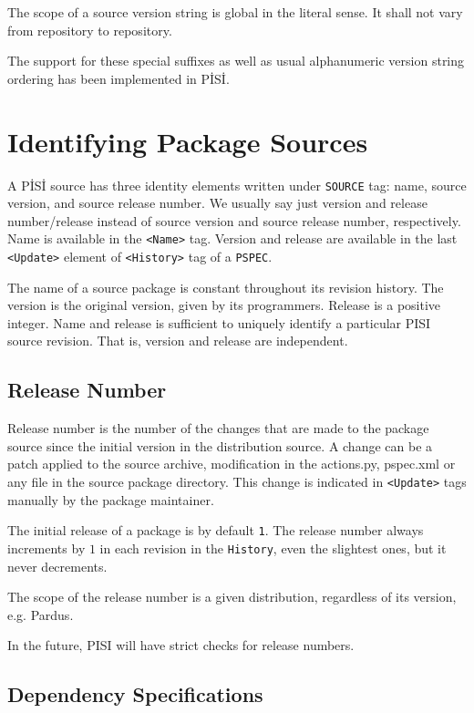 \documentclass[a4paper,11pt]{article}
\begin{document}
The scope of a source version string is global in the literal
sense. It shall not vary from repository to repository.

The support for these special suffixes as well as usual alphanumeric
version string ordering has been implemented in P\.IS\.I.

\section{Identifying Package Sources}

A P\.IS\.I source has three identity elements written under
\texttt{SOURCE} tag: name, source version, and source release number.
We usually say just version and release number/release instead of
source version and source release number, respectively. Name is available in
the \texttt{<Name>} tag. Version and release are available in the last
\texttt{<Update>} element of \texttt{<History>} tag of a \texttt{PSPEC}.

The name of a source package is constant throughout its revision
history. The version is the original version, given by its
programmers. Release is a positive integer.  Name and release 
is sufficient to uniquely identify a particular PISI source revision.
That is, version and release are independent.

\subsection{Release Number}

Release number is the number of the changes that are made to the
package source since the initial version in the distribution source. A
change can be a patch applied to the source archive, modification in
the actions.py, pspec.xml or any file in the source package
directory. This change is indicated in \texttt{<Update>} tags manually
by the package maintainer.

The initial release of a package is by default \texttt{1}. The release
number always increments by $1$ in each revision in the
\texttt{History}, even the slightest ones, but it never decrements.

The scope of the release number is a given distribution, regardless of
its version, e.g. Pardus.

In the future, PISI will have strict checks for release numbers.

\subsection{Dependency Specifications}
\end{document}

